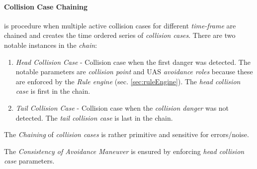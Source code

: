 \paragraph{Collision Case Chaining} is procedure when multiple active collision cases for different \emph{time-frame} are chained and creates the time ordered series of \emph{collision cases}. There are two notable instances in the \emph{chain}:
\begin{enumerate}
    \item \emph{Head Collision Case} - Collision case when the first danger was detected. The notable parameters are \emph{collision point} and UAS \emph{avoidance roles} because these are enforced by the \emph{Rule engine} (sec. \ref{sec:ruleEngine}). The \emph{head collision case} is first in the chain.
    
    \item \emph{Tail Collision Case} -  Collision case when the \emph{collision danger} was not detected. The \emph{tail collision case} is last in the chain.  
\end{enumerate}

\begin{note}
    The \emph{Chaining} of \emph{collision cases} is rather primitive and sensitive for errors/noise.
    
    The \emph{Consistency of Avoidance Maneuver} is ensured by enforcing \emph{head collision case} parameters. 
\end{note}

